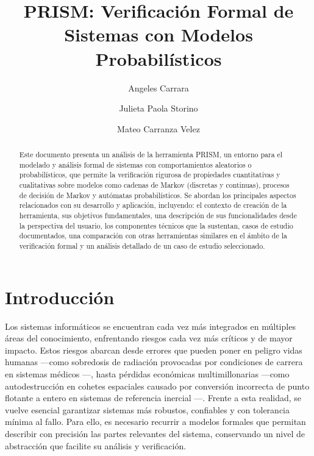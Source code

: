 \documentclass[runningheads]{llncs}
\begin{document}
\title{PRISM: Verificación Formal de Sistemas con Modelos Probabilísticos}

\author{
    Angeles Carrara\and
    Julieta Paola Storino\and
    Mateo Carranza Velez}



\maketitle

\begin{abstract}
Este documento presenta un análisis de la herramienta PRISM\cite{KNP11}, un entorno para el modelado y análisis formal de sistemas con comportamientos aleatorios o probabilísticos, que permite la verificación rigurosa de propiedades cuantitativas y cualitativas sobre modelos como cadenas de Markov (discretas y continuas), procesos de decisión de Markov y autómatas probabilísticos. Se abordan los principales aspectos relacionados con su desarrollo y aplicación, incluyendo: el contexto de creación de la herramienta, sus objetivos fundamentales, una descripción de sus funcionalidades desde la perspectiva del usuario, los componentes técnicos que la sustentan, casos de estudio documentados, una comparación con otras herramientas similares en el ámbito de la verificación formal y un análisis detallado de un caso de estudio seleccionado.
\end{abstract}

\section{Introducción}

Los sistemas informáticos se encuentran cada vez más integrados en múltiples áreas del conocimiento, enfrentando riesgos cada vez más críticos y de mayor impacto. Estos riesgos abarcan desde errores que pueden poner en peligro vidas humanas —como sobredosis de radiación provocadas por condiciones de carrera en sistemas médicos \cite{LT93}—, hasta pérdidas económicas multimillonarias —como autodestrucción en cohetes espaciales causado por conversión incorrecta de punto flotante a entero en sistemas de referencia inercial \cite{Lan96}—. Frente a esta realidad, se vuelve esencial garantizar sistemas más robustos, confiables y con tolerancia mínima al fallo. Para ello, es necesario recurrir a modelos formales que permitan describir con precisión las partes relevantes del sistema, conservando un nivel de abstracción que facilite su análisis y verificación.\\
\end{document}
